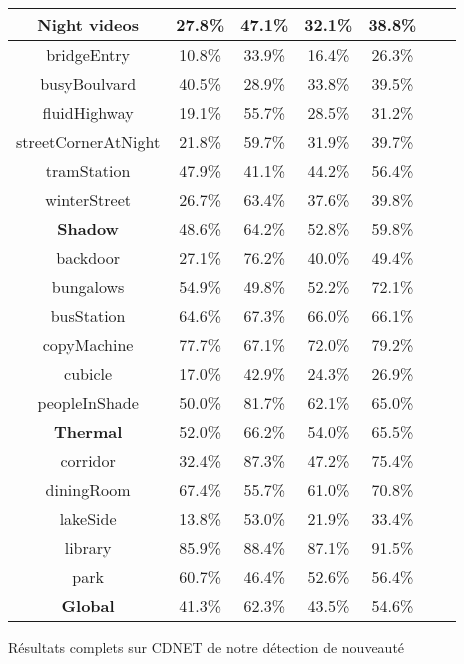 \begin{tableth}
\begin{tabular}{|c|c|c|c|c|c|c|}
		\hline
        \textbf{Night videos} & 27.8\% & 47.1\% & 32.1\% & 38.8\% & &\\
		\hline
bridgeEntry & 10.8\% & 33.9\% & 16.4\% & 26.3\% & &\\
busyBoulvard & 40.5\% & 28.9\% & 33.8\% & 39.5\% & &\\
fluidHighway & 19.1\% & 55.7\% & 28.5\% & 31.2\% & &\\
streetCornerAtNight & 21.8\% & 59.7\% & 31.9\% & 39.7\% & &\\
tramStation & 47.9\% & 41.1\% & 44.2\% & 56.4\% & &\\
winterStreet & 26.7\% & 63.4\% & 37.6\% & 39.8\% & &\\

		\hline
        \textbf{Shadow} & 48.6\% & 64.2\% & 52.8\% & 59.8\% & &\\
		\hline
backdoor & 27.1\% & 76.2\% & 40.0\% & 49.4\% & &\\
bungalows & 54.9\% & 49.8\% & 52.2\% & 72.1\% & &\\
busStation & 64.6\% & 67.3\% & 66.0\% & 66.1\% & &\\
copyMachine & 77.7\% & 67.1\% & 72.0\% & 79.2\% & &\\
cubicle & 17.0\% & 42.9\% & 24.3\% & 26.9\% & &\\
peopleInShade & 50.0\% & 81.7\% & 62.1\% & 65.0\% & &\\

		\hline
        \textbf{Thermal} & 52.0\% & 66.2\% & 54.0\% & 65.5\% & &\\
		\hline
corridor & 32.4\% & 87.3\% & 47.2\% & 75.4\% & &\\
diningRoom & 67.4\% & 55.7\% & 61.0\% & 70.8\% & &\\
lakeSide & 13.8\% & 53.0\% & 21.9\% & 33.4\% & &\\
library & 85.9\% & 88.4\% & 87.1\% & 91.5\% & &\\
park & 60.7\% & 46.4\% & 52.6\% & 56.4\% & &\\

		\hline
        \textbf{Global} & 41.3\% & 62.3\% & 43.5\% & 54.6\% & &\\
    	\hline
	\end{tabular}
	\caption{Résultats complets sur CDNET de notre détection de nouveauté}
	\label{tab:res:complet1}
	\end{tableth}


